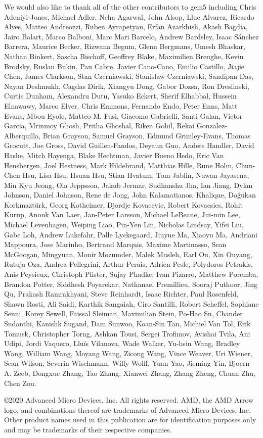 \documentclass[sigconf,nonacm,screen=true]{acmart}
\begin{document}
We would also like to thank all of the other contributors to gem5 including
Chris Adeniyi-Jones, Michael Adler, Neha Agarwal, John Alsop, Lluc Alvarez, Ricardo Alves, Matteo Andreozzi, Ruben Ayrapetyan, Erfan Azarkhish, Akash Bagdia, Jairo Balart, Marco Balboni, Marc Mari Barcelo, Andrew Bardsley, Isaac S\'anchez Barrera, Maurice Becker, Rizwana Begum, Glenn Bergmans, Umesh Bhaskar, Nathan Binkert, Sascha Bischoff, Geoffrey Blake, Maximilien Breughe, Kevin Brodsky, Ruslan Bukin, Pau Cabre, Javier Cano-Cano, Emilio Castillo, Jiajie Chen, James Clarkson, Stan Czerniawski, Stanislaw Czerniawski, Sandipan Das, Nayan Deshmukh, Cagdas Dirik, Xiangyu Dong, Gabor Dozsa, Ron Dreslinski, Curtis Dunham, Alexandru Dutu, Yasuko Eckert, Sherif Elhabbal, Hussein Elnawawy, Marco Elver, Chris Emmons, Fernando Endo, Peter Enns, Matt Evans, Mbou Eyole, Matteo M. Fusi, Giacomo Gabrielli, Santi Galan, Victor Garcia, Mrinmoy Ghosh, Pritha Ghoshal, Riken Gohil, Rekai Gonzalez-Alberquilla, Brian Grayson, Samuel Grayson, Edmund Grimley-Evans, Thomas Grocutt, Joe Gross, David Guillen-Fandos, Deyaun Guo, Anders Handler, David Hashe, Mitch Hayenga, Blake Hechtman, Javier Bueno Hedo, Eric Van Hensbergen, Joel Hestness, Mark Hildebrand, Matthias Hille, Rune Holm, Chun-Chen Hsu, Lisa Hsu, Hsuan Hsu, Stian Hvatum, Tom Jablin, Nuwan Jayasena, Min Kyu Jeong, Ola Jeppsson, Jakub Jermar, Sudhanshu Jha, Ian Jiang, Dylan Johnson, Daniel Johnson, Rene de Jong, John Kalamatianos, Khalique, Do\u{g}ukan Korkmazt\"urk, Georg Kotheimer, Djordje Kovacevic, Robert Kovacsics, Rohit Kurup, Anouk Van Laer, Jan-Peter Larsson, Michael LeBeane, Jui-min Lee, Michael Levenhagen, Weiping Liao, Pin-Yen Lin, Nicholas Lindsay, Yifei Liu, Gabe Loh, Andrew Lukefahr, Palle Lyckegaard, Jiuyue Ma, Xiaoyu Ma, Andriani Mappoura, Jose Marinho, Bertrand Marquis, Maxime Martinasso, Sean McGoogan, Mingyuan, Monir Mozumder, Malek Musleh, Earl Ou, Xin Ouyang, Rutuja Oza, Andrea Pellegrini, Arthur Perais, Adrien Pesle, Polydoros Petrakis, Anis Peysieux, Christoph Pfister, Sujay Phadke, Ivan Pizarro, Matthew Poremba, Brandon Potter, Siddhesh Poyarekar, Nathanael Premillieu, Sooraj Puthoor, Jing Qu, Prakash Ramrakhyani, Steve Reinhardt, Isaac Richter, Paul Rosenfeld, Shawn Rosti, Ali Saidi, Karthik Sangaiah, Ciro Santilli, Robert Scheffel, Sophiane Senni, Korey Sewell, Faissal Sleiman, Maximilian Stein, Po-Hao Su, Chander Sudanthi, Kanishk Sugand, Dam Sunwoo, Koan-Sin Tan, Michiel Van Tol, Erik Tomusk, Christopher Torng, Ashkan Tousi, Sergei Trofimov, Avishai Tvila, Ani Udipi, Jordi Vaquero, Llu\'is Vilanova, Wade Walker, Yu-hsin Wang, Bradley Wang, William Wang, Moyang Wang, Zicong Wang, Vince Weaver, Uri Wiener, Sean Wilson, Severin Wischmann, Willy Wolff, Yuan Yao, Jieming Yin, Bjoern A. Zeeb, Dongxue Zhang, Tao Zhang, Xianwei Zhang, Zhang Zheng, Chuan Zhu, Chen Zou.

\copyright 2020 Advanced Micro Devices, Inc. All rights reserved.
AMD, the AMD Arrow logo, and combinations thereof are trademarks of Advanced
Micro Devices, Inc. Other product names used in this publication are for
identification purposes only and may be trademarks of their respective
companies.



\end{document}
